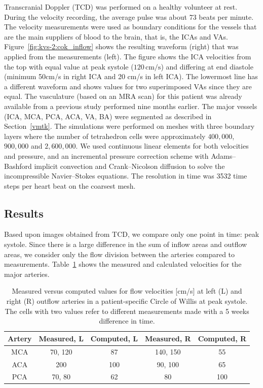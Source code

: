 Transcranial Doppler (TCD) was performed on a healthy volunteer at
rest. During the velocity recording, the average pulse was about 73
beats per minute. The velocity measurements were used as boundary
conditions for the vessels that are the main suppliers of blood to the
brain, that is, the ICAs and VAs. Figure~\ref{fig:kvs-2:cok_inflow}
shows the resulting waveform (right) that was applied from the
measurements (left). The figure shows the ICA velocities from the top
with equal value at peak systole ($120\,\mathrm{cm}/\mathrm{s}$) and
differing at end diastole (minimum 50cm/s in right ICA and 20 cm/s in
left ICA). The lowermost line has a different waveform and shows
values for two superimposed VAs since they are equal. The vasculature
(based on an MRA scan) for this patient was already available from a
previous study performed nine months earlier. The major vessels (ICA,
MCA, PCA, ACA, VA, BA) were segmented as described in
Section~\ref{vmtk}. The simulations were performed on meshes with
three boundary layers where the number of tetrahedron cells were
approximately $400,000$, $900,000$ and $2,600,000$. We used continuous
linear elements for both velocities and pressure, and an incremental
pressure correction scheme with Adams--Bashford implicit convection
and Crank--Nicolson diffusion to solve the incompressible
Navier--Stokes equations. The resolution in time was 3532 time steps
per heart beat on the coarsest mesh.

\subsection{Results}

Based upon images obtained from TCD, we compare only one point in
time: peak systole. Since there is a large difference in the sum of
inflow areas and outflow areas, we consider only the flow division
between the arteries compared to measurements.
Table~\ref{measure_vs_comp} shows the measured and calculated
velocities for the major arteries.

\begin{table}
  \center
  \begin{tabular}  {  c | c | c | c | c }
    Artery &Measured, L&Computed, L &Measured, R&Computed, R \\
    \hline
    MCA & 70, 120 		& 87  & 140, 150 	& 55	\\
    ACA & 200  		& 100  	& 90, 100 	& 65	\\
    PCA & 70, 80  		& 62 	& 80  		& 100  \\
  \end{tabular}
  \caption{Measured versus computed values for flow
    velocities [cm/s] at left (L) and right (R) outflow arteries in a patient-specific Circle of Willis at peak
    systole. The cells with two values refer to different measurements
    made with a 5 weeks difference in time.}
  \label{measure_vs_comp}
\end{table}

